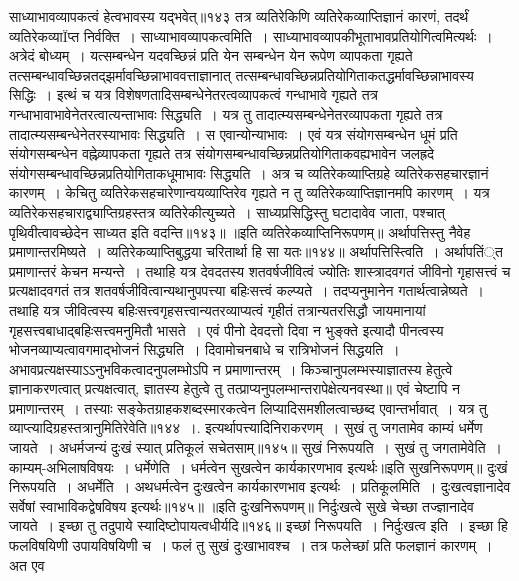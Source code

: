 साध्याभावव्यापकत्वं हेत्वभावस्य यद्भवेत्॥१४३
तत्र व्यतिरेकिणि व्यतिरेकव्याप्तिज्ञानं कारणं, तदर्थं व्यतिरेकव्याÏप्त निर्वक्ति~। साध्याभावव्यापकत्वमिति~। साध्याभावव्यापकीभूताभावप्रतियोगित्वमित्यर्थः~। अत्रेदं
बोध्यम्~। यत्सम्बन्धेन यदवच्छिन्नं प्रति येन सम्बन्धेन येन रूपेण व्यापकता गृह्यते तत्सम्बन्धावच्छिन्नतद्झर्मावच्छिन्नाभाववत्ताज्ञानात्
तत्सम्बन्धावच्छिन्नप्रतियोगिताकतद्धर्मावच्छिन्नाभावस्य सिद्धिः~। इत्थं च यत्र विशेषणतादिसम्बन्धेनेतरत्वव्यापकत्वं गन्धाभावे गृह्यते तत्र गन्धाभावाभावेनेतरत्वात्यन्ताभावः
सिद्ध्यति~। यत्र तु तादात्म्यसम्बन्धेनेतरव्यापकता गृह्यते तत्र तादात्म्यसम्बन्धेनेतरस्याभावः सिद्ध्यति~। स एवान्योन्याभावः~। एवं यत्र संयोगसम्बन्धेन धूमं प्रति
संयोगसम्बन्धेन वह्नेव्र्यापकता गृह्यते तत्र संयोगसम्बन्धावच्छिन्नप्रतियोगिताकवह्यभावेन जलह्रदे संयोगसम्बन्धावच्छिन्नप्रतियोगिताकधूमाभावः सिद्ध्यति~।
अत्र च व्यतिरेकव्याप्तिग्रहे व्यतिरेकसहचारज्ञानं कारणम्~।
केचितु व्यतिरेकसहचारेणान्वयव्याप्तिरेव गृह्यते न तु व्यतिरेकव्याप्तिज्ञानमपि कारणम्~। यत्र व्यतिरेकसहचाराद्व्याप्तिग्रहस्तत्र व्यतिरेकीत्युच्यते~। साध्यप्रसिद्धिस्तु
घटादावेव जाता, पश्चात् पृथिवीत्वावच्छेदेन साध्यत इति वदन्ति॥१४३॥
॥इति व्यतिरेकव्याप्तिनिरूपणम्॥
अर्थापत्तिस्तु नैवेह प्रमाणान्तरमिष्यते~।
व्यतिरेकव्याप्तिबुद्धया चरितार्था हि सा यतः॥१४४॥
अर्थापत्तिस्त्विति~। अर्थापतिं्त प्रमाणान्तरं केचन मन्यन्ते~। तथाहि यत्र देवदतस्य शतवर्षजीवित्वं ज्योतिः शास्त्रादवगतं जीविनो गृहासत्त्वं च प्रत्यक्षादवगतं तत्र
शतवर्षजीवित्वान्यथानुपपत्त्या बहिःसत्त्वं कल्प्यते~। तदप्यनुमानेन गतार्थत्वान्नेष्यते~। तथाहि यत्र जीवित्वस्य बहिःसत्त्वगृहसत्त्वान्यतरव्याप्यत्वं गृहीतं तत्रान्यतरसिद्धौ
जायमानायां गृहसत्त्वबाधाद्बहिःसत्त्वमनुमितौ भासते~। एवं पीनो देवदत्तो दिवा न भुङ्क्ते इत्यादौ पीनत्वस्य भोजनव्याप्यत्वावगमाद्भोजनं सिद्ध्यति~। दिवामोचनबाधे च
रात्रिभोजनं सिद्धयति~।
अभावप्रत्यक्षस्याऽऽनुभविकत्वादनुपलम्भोऽपि न प्रमाणान्तरम्~। किञ्चानुपलम्भस्याज्ञातस्य हेतुत्वे ज्ञानाकरणत्वात् प्रत्यक्षत्वात्, ज्ञातस्य हेतुत्वे तु
तत्प्राप्यनुपलम्भान्तरापेक्षेत्यनवस्था॥
एवं चेष्टापि न प्रमाणान्तरम्~। तस्याः सङ्केतग्राहकशब्दस्मारकत्वेन लिप्यादिसमशीलत्वाच्छब्द एवान्तर्भावात्~। यत्र तु व्याप्त्यादिग्रहस्तत्रानुमितिरेवेति॥१४४~।.
इत्यर्थापत्त्यादिनिराकरणम्~।
सुखं तु जगतामेव काम्यं धर्मेण जायते~।
अधर्मजन्यं दुःखं स्यात् प्रतिकूलं सचेतसाम्॥१४५॥
सुखं निरूपयति~। सुखं तु जगतामेवेति~। काम्यम्-अभिलाषविषयः~। धर्मेणेति~। धर्मत्वेन सुखत्वेन कार्यकारणभाव इत्यर्थः॥इति सुखनिरूपणम्॥
दुःखं निरूपयति~। अधर्मेति~। अथधर्मत्वेन दुःखत्वेन कार्यकारणभाव इत्यर्थः~। प्रतिकूलमिति~। दुःखत्वज्ञानादेव सर्वेषां स्वाभाविकद्वेषविषय इत्यर्थः॥१४५॥
॥इति दुःखनिरूपणम्॥
निर्दुःखत्वे सुखे चेच्छा तज्ज्ञानादेव जायते~।
इच्छा तु तदुपाये स्यादिष्टोपायत्वधीर्यदि॥१४६॥
इच्छां निरूपयति~। निर्दुःखत्व इति~। इच्छा हि फलविषयिणी उपायविषयिणी च~। फलं तु सुखं दुःखाभावश्च~। तत्र फलेच्छां प्रति फलज्ञानं कारणम्~। अत एव
